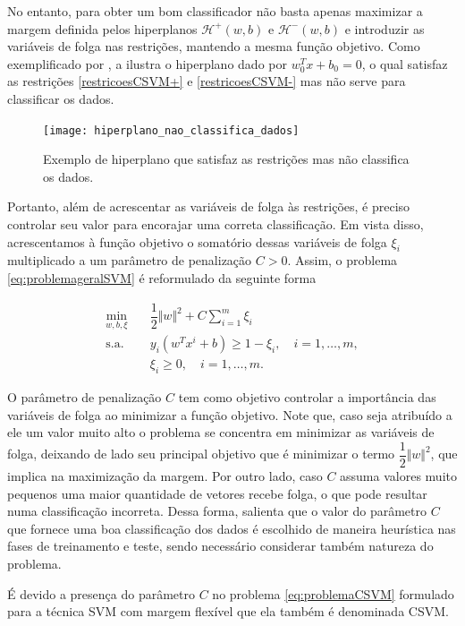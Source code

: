 \documentclass[12pt,a4paper]{scrartcl}
\def\Hset{\mathcal{H}}
\theoremstyle{definition}%
\begin{document}
No entanto, para obter um bom classificador não basta apenas maximizar a margem definida pelos hiperplanos $\Hset^{+} (w,b)$ e $\Hset^{-} (w,b)$ e introduzir as variáveis de folga nas restrições, mantendo a mesma função objetivo. Como exemplificado por \textcite[p. 45]{Evelin2017}, a  ilustra o hiperplano dado por $w_{0}^{T}x+b_{0} = 0$, o qual satisfaz as restrições \eqref{restricoesCSVM+} e \eqref{restricoesCSVM-} mas não serve para classificar os dados. 

\begin{figure}[!ht] 
	\centering
	\texttt{[image: hiperplano\_nao\_classifica\_dados]}
	\caption{Exemplo de hiperplano que satisfaz as restrições mas não classifica os dados. \label{fig:hiperplano_nao_classificador}}
\end{figure}
 
Portanto, além  de acrescentar as variáveis de folga às restrições, é preciso controlar seu valor para encorajar uma correta classificação. Em vista disso, acrescentamos à função objetivo o somatório dessas variáveis de folga $\xi_{i}$ multiplicado a um parâmetro de penalização $C>0$. Assim, o problema \eqref{eq:problemageralSVM} é reformulado da seguinte forma

\[ \label{eq:problemaCSVM}
\begin{aligned}
\min_{w,b,\xi} & \quad \dfrac{1}{2} \Vert w\Vert^{2} + C \sum_{i=1}^{m} \xi_{i} \\
\text{s.a.} &  \quad y_i(w^{T}x^{i}+b) \geq 1 - \xi_{i}, \quad i=1, \ldots , m, \\
& \quad \xi_{i} \geq 0, \quad i=1, \ldots , m.\end{aligned}
\]

O parâmetro de penalização $C$ tem como objetivo controlar a importância das variáveis de folga ao minimizar a função objetivo. Note que, caso seja atribuído a ele um valor muito alto o problema se concentra em minimizar as variáveis de folga, deixando de lado seu principal objetivo que é minimizar o termo $\dfrac{1}{2} \Vert w \Vert^{2}$, que implica na maximização da margem. Por outro lado, caso $C$ assuma valores muito pequenos uma maior quantidade de vetores recebe folga, o que pode resultar numa classificação incorreta. Dessa forma, \textcite{Evelin2017} salienta que o valor do parâmetro $C$ que fornece uma boa classificação dos dados é escolhido de maneira heurística nas fases de treinamento e teste, sendo necessário considerar também natureza do problema. 

É devido a presença do parâmetro $C$ no problema \eqref{eq:problemaCSVM} formulado para a técnica SVM com margem flexível que ela também é denominada CSVM.
\end{document}
